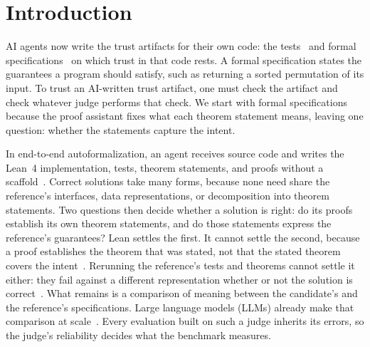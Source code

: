 \section{Introduction}
AI agents now write the trust artifacts for their own code: the tests~\citep{haque2026agentictests} and formal specifications~\citep{yang2024formalreasoning} on which trust in that code rests.
A formal specification states the guarantees a program should satisfy, such as returning a sorted permutation of its input.
To trust an AI-written trust artifact, one must check the artifact and check whatever judge performs that check.
We start with formal specifications because the proof assistant fixes what each theorem statement means, leaving one question: whether the statements capture the intent.

In end-to-end autoformalization, an agent receives source code and writes the Lean~4 implementation, tests, theorem statements, and proofs without a scaffold~\citep{miranda2026veribench}.
Correct solutions take many forms, because none need share the reference's interfaces, data representations, or decomposition into theorem statements.
Two questions then decide whether a solution is right: do its proofs establish its own theorem statements, and do those statements express the reference's guarantees?
Lean settles the first.
It cannot settle the second, because a proof establishes the theorem that was stated, not that the stated theorem covers the intent~\citep{lahiri2024evaluating}.
Rerunning the reference's tests and theorems cannot settle it either: they fail against a different representation whether or not the solution is correct~\citep{miranda2026veribench}.
What remains is a comparison of meaning between the candidate's and the reference's specifications.
Large language models (LLMs) already make that comparison at scale~\citep{miranda2026veribench,lin2025goedelprover}.
Every evaluation built on such a judge inherits its errors, so the judge's reliability decides what the benchmark measures.


